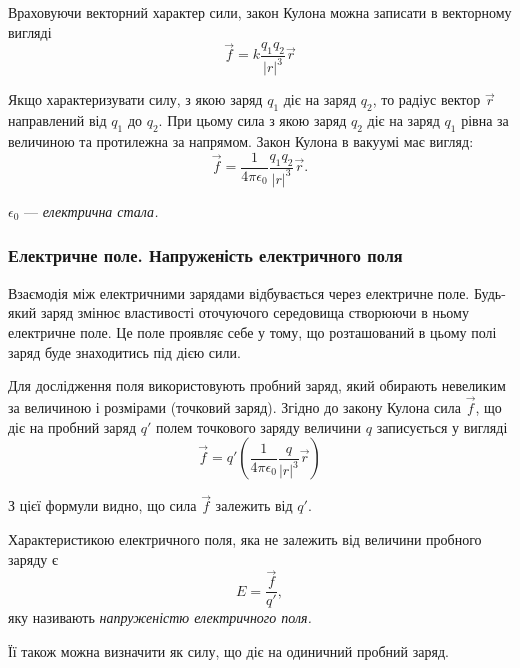 Враховуючи векторний характер сили, закон Кулона можна записати в векторному вигляді
\begin{equation}
	\vec f = k \frac{q_1 q_2}{|r|^3} \vec r
\end{equation}

Якщо характеризувати силу, з якою заряд $q_1$ діє на заряд $q_2$, то радіус вектор $\vec r$ направлений від $q_1$ до $q_2$. При цьому сила з якою заряд $q_2$ діє на заряд $q_1$ рівна за величиною та протилежна за напрямом. Закон Кулона в вакуумі має вигляд:
\begin{equation}
	\vec f = \frac{1}{4 \pi \epsilon_0} \frac{q_1q_2}{|r|^3} \vec r.
\end{equation}

\begin{definition}
	$\epsilon_0$ --- \it{електрична стала}.
\end{definition}

\subsubsection{Електричне поле. Напруженість електричного поля}

Взаємодія між електричними зарядами відбувається через електричне поле. Будь-який заряд змінює властивості оточуючого середовища створюючи в ньому електричне поле. Це поле проявляє себе у тому, що розташований в цьому полі заряд буде знаходитись під дією сили. \medskip

Для дослідження поля використовують пробний заряд, який обирають невеликим за величиною і розмірами (точковий заряд). Згідно до закону Кулона сила $\vec f$, що діє на пробний заряд  $q'$  полем точкового заряду величини $q$ записується у вигляді
\begin{equation}
	\vec f = q' \left( \frac{1}{4 \pi \epsilon_0} \frac{q}{|r|^3} \vec r \right)
\end{equation}

З цієї формули видно, що сила $\vec f$ залежить від $q'$.

\begin{definition}
	Характеристикою електричного поля, яка не залежить від величини пробного заряду є
	\begin{equation}
		E = \frac{\vec f}{q'},
	\end{equation}
	яку називають \it{напруженістю електричного поля}.
\end{definition}

\begin{remark}
	Її також можна визначити як силу, що діє на одиничний пробний заряд.
\end{remark}

